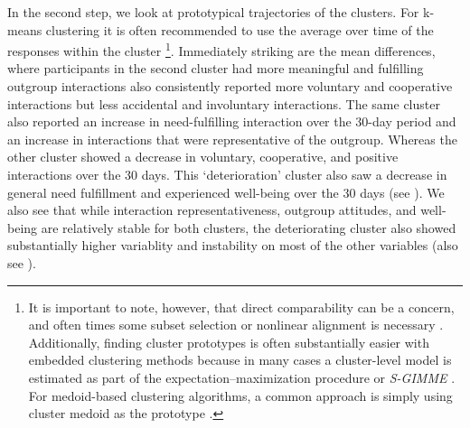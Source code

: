 In the second step, we look at prototypical trajectories of the
clusters. For k-means clustering it is often recommended to use the
average over time of the responses within the cluster
\citep[see ;][]{niennattrakul2007}\footnote{It is important to note, however, that direct comparability can be a concern, and often times some subset selection or nonlinear alignment is necessary \citep[e.g.,][]{gupta1996}. Additionally, finding cluster prototypes is often substantially easier with embedded clustering methods because in many cases a cluster-level model is estimated as part of the expectation–maximization procedure \citep[e.g.,][]{denteuling2021} or \textit{S-GIMME} \citep[e.g.][]{lane2019}. For medoid-based clustering algorithms, a common approach is simply using cluster medoid as the prototype \citep{kaufman1990}.}.
Immediately striking are the mean differences, where participants in the
second cluster had more meaningful and fulfilling outgroup interactions
also consistently reported more voluntary and cooperative interactions
but less accidental and involuntary interactions. The same cluster also
reported an increase in need-fulfilling interaction over the 30-day
period and an increase in interactions that were representative of the
outgroup. Whereas the other cluster showed a decrease in voluntary,
cooperative, and positive interactions over the 30 days. This
`deterioration' cluster also saw a decrease in general need fulfillment
and experienced well-being over the 30 days (see
). We also see that while interaction
representativeness, outgroup attitudes, and well-being are relatively stable
for both clusters, the deteriorating cluster also showed substantially
higher variablity and instability on most of the other variables (also see
).

